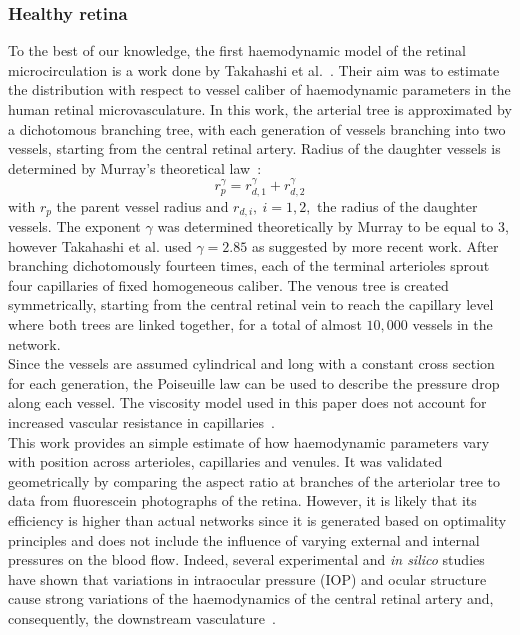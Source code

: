 \documentclass[12pt,a4paper]{journal}
\begin{document}
\subsubsection{Healthy retina}

To the best of our knowledge, the first haemodynamic model of the retinal microcirculation is a work done by Takahashi et al.~\cite{Takahashi_2009}.
Their aim was to estimate the distribution with respect to vessel caliber of haemodynamic parameters in the human retinal microvasculature.
In this work, the arterial tree is approximated by a dichotomous branching tree, with each generation of vessels branching into two vessels, starting from the central retinal artery.
Radius of the daughter vessels is determined by Murray's theoretical law~\cite{Murray_1926}:
\begin{equation}
  \label{eq:MurrayLaw}
  r_p^\gamma = r_{d,1}^\gamma + r_{d,2}^\gamma
\end{equation}
with $r_p$ the parent vessel radius and $r_{d,i},~i=1,2,$ the radius of the daughter vessels.
The exponent $\gamma$ was determined theoretically by Murray to be equal to $3$, however Takahashi et al. used $\gamma=2.85$ as suggested by more recent work.
After branching dichotomously fourteen times, each of the terminal arterioles sprout four capillaries of fixed homogeneous caliber. 
The venous tree is created symmetrically, starting from the central retinal vein to reach the capillary level where both trees are linked together, for a total of almost $10,000$ vessels in the network.\\
Since the vessels are assumed cylindrical and long with a constant cross section for each generation, the Poiseuille law can be used to describe the pressure drop along each vessel.
The viscosity model used in this paper does not account for increased vascular resistance in capillaries~\cite{Haynes_1960}. \\
This work provides an simple estimate of how haemodynamic parameters vary with position across arterioles, capillaries and venules.  
It was validated geometrically by comparing the aspect ratio at branches of the arteriolar tree to data from fluorescein photographs of the retina. 
However, it is likely that its efficiency is higher than actual networks since it is generated based on optimality principles and does not include the influence of varying external and internal pressures on the blood flow.
Indeed, several experimental and \textit{in silico} studies have shown that variations in intraocular pressure (IOP) and ocular structure cause strong variations of the haemodynamics of the central retinal artery and, consequently, the downstream vasculature~\cite{Guidoboni_2014, Harris_1996}.
\end{document}
